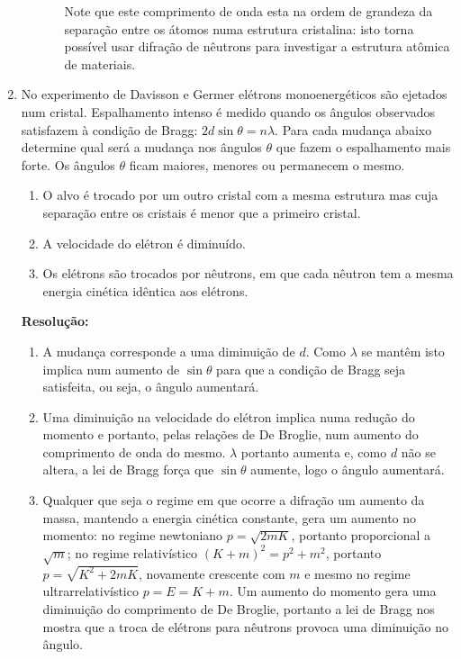 \documentclass[a4paper, 12pt, notitlepage]{article}
\begin{document}
\begin{enumerate}
\begin{enumerate}
\begin{enumerate}
      Note que este comprimento de onda esta na ordem de grandeza da separação entre os átomos numa estrutura cristalina: isto torna possível usar difração de nêutrons para investigar a estrutura atômica de materiais.

    \end{enumerate}

\end{enumerate}

\item No experimento de Davisson e Germer elétrons monoenergéticos são ejetados num cristal. Espalhamento intenso é medido quando os ângulos observados satisfazem à condição de Bragg: $2d\sin \theta = n\lambda$. Para cada mudança abaixo determine qual será a mudança nos ângulos $\theta$ que fazem o espalhamento mais forte. Os ângulos $\theta$ ficam maiores, menores ou permanecem o mesmo.
\begin{enumerate}
  \item O alvo é trocado por um outro cristal com a mesma estrutura mas cuja separação entre os cristais é menor que a primeiro cristal.

  \item A velocidade do elétron é diminuído.

  \item Os elétrons são trocados por nêutrons, em que cada nêutron tem a mesma energia cinética idêntica aos elétrons.
\end{enumerate}

\textbf{Resolução: }
\begin{enumerate}
  \item A mudança corresponde a uma diminuição de $d$. Como $\lambda$ se mantêm isto implica num aumento de $\sin \theta$ para que a condição de Bragg seja satisfeita, ou seja, o ângulo aumentará.
  
  \item Uma diminuição na velocidade do elétron implica numa redução do momento e portanto, pelas relações de De Broglie, num aumento do comprimento de onda do mesmo. $\lambda$ portanto aumenta e, como $d$ não se altera, a lei de Bragg força que $\sin \theta$ aumente, logo o ângulo aumentará.
  
  \item Qualquer que seja o regime em que ocorre a difração um aumento da massa, mantendo a energia cinética constante, gera um aumento no momento: no regime newtoniano $p = \sqrt{2mK}$, portanto proporcional a $\sqrt{m}$; no regime relativístico $(K + m)^2 = p^2 + m^2$, portanto $p = \sqrt{K^2 + 2mK}$, novamente crescente com $m$ e mesmo no regime ultrarrelativístico $p = E = K + m$. Um aumento do momento gera uma diminuição do comprimento de De Broglie, portanto a lei de Bragg nos mostra que a troca de elétrons para nêutrons provoca uma diminuição no ângulo.
\end{enumerate}


\end{enumerate}
\end{document}
